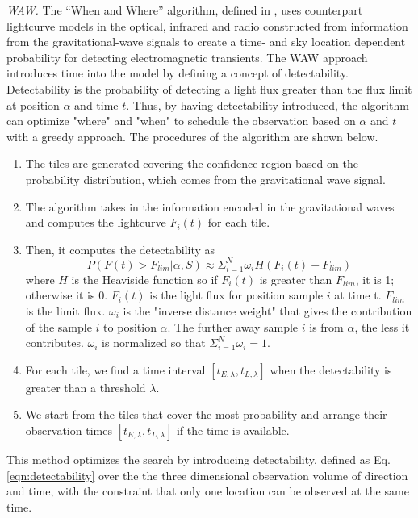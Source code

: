 \documentclass[twocolumn]{aastex62}
\begin{document}
\emph{WAW.} The ``When and Where'' algorithm, defined in \cite{SoCo2017}, uses counterpart lightcurve models in the optical, infrared and radio constructed from information from the gravitational-wave signals to create a time- and sky location dependent probability for detecting electromagnetic transients. The WAW approach introduces time into the model by defining a concept of detectability. Detectability is the probability of detecting a light flux greater than the flux limit at position $\alpha$ and time $t$. Thus, by having detectability introduced, the algorithm can optimize "where" and "when" to schedule the observation based on $\alpha$ and $t$ with a greedy approach. The procedures of the algorithm are shown below.
\begin{enumerate}
\item The tiles are generated covering the confidence region based on the probability distribution, which comes from the gravitational wave signal.
\item The algorithm takes in the information encoded in the gravitational waves and computes the lightcurve $F_i(t)$ for each tile. 
\item Then, it computes the detectability as
\begin{equation}\label{eqn:detectability}
P(F(t) > F_{lim}|\alpha, S)\approx\Sigma_{i=1}^N\omega_i H(F_i(t)-F_{lim})
\end{equation}
where $H$ is the Heaviside function so if $F_i(t)$ is greater than $F_{lim}$, it is 1; otherwise it is 0. $F_i(t)$ is the light flux for position sample $i$ at time t. $F_{lim}$ is the limit flux. $\omega_i$ is the "inverse distance weight" that gives the contribution of the sample $i$ to position $\alpha$. The further away sample $i$ is from $\alpha$, the less it contributes. $\omega_i$ is normalized so that $\Sigma_{i=1}^N\omega_i=1$. 
\item For each tile, we find a time interval $[t_{E,\lambda},t_{L,\lambda}]$ when the detectability is greater than a threshold $\lambda$.
\item We start from the tiles that cover the most probability and arrange their observation times $[t_{E,\lambda},t_{L,\lambda}]$ if the time is available.
\end{enumerate}
This method optimizes the search by introducing detectability, defined as Eq.\ref{eqn:detectability} over the the three dimensional observation volume of direction and time, with the constraint that only one location can be observed at the same time.
\end{document}
